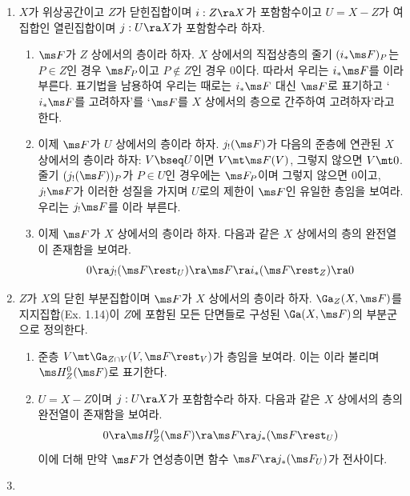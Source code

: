 \begin{enumerate}[label=\tb{1.\arabic*.},itemindent=0mm,itemsep=2mm]
	\item {} $X$가 위상공간이고 $Z$가 닫힌집합이며 $i:Z\ra X$가 포함함수이고
	$U=X-Z$가 여집합인 열린집합이며 $j:U\ra X$가 포함함수라 하자.
	\begin{enumerate}[label=(\alph*)]
	\item $\ms F$가 $Z$ 상에서의 층이라 하자. $X$ 상에서의 직접상층의 줄기 $(i_*\ms F)_P$는
	$P\in Z$인 경우 $\ms F_P$이고 $P\notin Z$인 경우 0이다.
	따라서 우리는 $i_*\ms F$를 이라 부른다.
	표기법을 남용하여 우리는 때로는 $i_*\ms F$ 대신 $\ms F$로 표기하고 `$i_*\ms F$를 고려하자'를 
	`$\ms F$를 $X$ 상에서의 층으로 간주하여 고려하자'라고 한다.
	\item 이제 $\ms F$가 $U$ 상에서의 층이라 하자. $j_!(\ms F)$가 다음의 준층에 연관된 $X$ 상에서의 층이라 하자:
	$V\bseq U$이면 $V\mt\ms F(V)$, 그렇지 않으면 $V\mt 0$.
	줄기 $(j_!(\ms F))_P$가 $P\in U$인 경우에는 $\ms F_P$이며 그렇지 않으면 0이고,
	$j_!\ms F$가 이러한 성질을 가지며 $U$로의 제한이 $\ms F$인 유일한 층임을 보여라.
	우리는 $j_!\ms F$를 이라 부른다.
	\item 이제 $\ms F$가 $X$ 상에서의 층이라 하자. 다음과 같은 $X$ 상에서의 층의 완전열이 존재함을 보여라.
	$$0\ra j_!(\ms F\rest_U)\ra\ms F\ra i_*(\ms F\rest_Z)\ra 0$$
	\end{enumerate}
	\item {}
	$Z$가 $X$의 닫힌 부분집합이며 $\ms F$가 $X$ 상에서의 층이라 하자.
	$\Ga_Z(X,\ms F)$를 지지집합(Ex. 1.14)이 $Z$에 포함된 모든 단면들로 구성된 $\Ga(X,\ms F)$의 부분군으로 정의한다.
	\begin{enumerate}[label=(\alph*)]
	\item 준층 $V\mt\Ga_{Z\cap V}(V,\ms F\rest_V)$가 층임을 보여라.
	이는 이라 불리며 $\ms H_Z^0(\ms F)$로 표기한다.
	\item $U=X-Z$이며 $j:U\ra X$가 포함함수라 하자. 다음과 같은 $X$ 상에서의 층의 완전열이 존재함을 보여라.
	$$0\ra\ms H_Z^0(\ms F)\ra\ms F\ra j_*(\ms F\rest_U)$$
	이에 더해 만약 $\ms F$가 연성층이면 함수 $\ms F\ra j_*(\ms F_U)$가 전사이다.
	\end{enumerate}
	\item {}

\end{enumerate}
